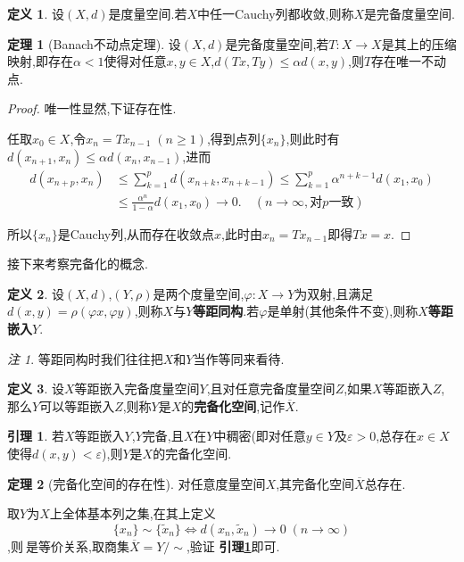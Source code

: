 \documentclass{ctexart}
\theoremstyle{definition}
\newtheorem{definition}{定义}
\newtheorem{lemma}{引理}
\newtheorem{theorem}{定理}
\theoremstyle{remark}
\newtheorem*{remark}{注}
\newenvironment{proofsketch}{
  \renewcommand{\proofname}{证明概要}\proof}{\endproof}
\newcommand\lemmaref[1]{\textbf{引理\ref{#1}}}
\begin{document}
	\begin{definition}
		设$(X,d)$是度量空间.若$X$中任一Cauchy列都收敛,则称$X$是完备度量空间.
	\end{definition}
	\begin{theorem}[Banach不动点定理]
		设$(X,d)$是完备度量空间,若$T:X\to X$是其上的压缩映射,即存在$\alpha<1$使得对任意$x,y\in X$,$d(Tx,Ty)\le\alpha d(x,y)$,则$T$存在唯一不动点.
	\end{theorem}
	\begin{proof}
		唯一性显然,下证存在性.
		
		任取$x_0\in X$,令$x_n=Tx_{n-1}\;(n\ge 1)$,得到点列$\{x_n\}$,则此时有$d(x_{n+1},x_n)\le\alpha d(x_n,x_{n-1})$,进而
		\begin{align*}
			d(x_{n+p},x_n) & \le\sum_{k=1}^p{d(x_{n+k},x_{n+k-1})}\le\sum_{k=1}^p{\alpha^{n+k-1}d(x_1,x_0)} \\
			& \le\frac{\alpha^n}{1-\alpha}d(x_1,x_0)\to 0.\quad(n\to\infty,\mbox{对}p\mbox{一致})
		\end{align*}
		
		所以$\{x_n\}$是Cauchy列,从而存在收敛点$x$,此时由$x_n=Tx_{n-1}$即得$Tx=x$.
	\end{proof}
	
	接下来考察完备化的概念.
	\begin{definition}
		设$(X,d)$,$(Y,\rho)$是两个度量空间,$\varphi:X\to Y$为双射,且满足$d(x,y)=\rho(\varphi x,\varphi y)$,则称$X$与$Y$\textbf{等距同构}.若$\varphi$是单射(其他条件不变),则称$X$\textbf{等距嵌入}$Y$.
	\end{definition}
	\begin{remark}
		等距同构时我们往往把$X$和$Y$当作等同来看待.
	\end{remark}
	\begin{definition}
		设$X$等距嵌入完备度量空间$Y$,且对任意完备度量空间$Z$,如果$X$等距嵌入$Z$,那么$Y$可以等距嵌入$Z$,则称$Y$是$X$的\textbf{完备化空间},记作$\overline{X}$.
	\end{definition}
	\begin{lemma}\label{complete-lemma}
		若$X$等距嵌入$Y$,$Y$完备,且$X$在$Y$中稠密(即对任意$y\in Y$及$\varepsilon>0$,总存在$x\in X$使得$d(x,y)<\varepsilon$),则$Y$是$X$的完备化空间.
	\end{lemma}
	\begin{theorem}[完备化空间的存在性]
		对任意度量空间$X$,其完备化空间$\overline{X}$总存在.
	\end{theorem}
	\begin{proofsketch}
		取$Y$为$X$上全体基本列之集,在其上定义
		$$\{x_n\}\sim\{\tilde{x}_n\}\Leftrightarrow d(x_n,\tilde{x}_n)\to 0\;(n\to\infty)$$
		,则$~$是等价关系,取商集$\overline{X}=Y/\sim$,验证 \lemmaref{complete-lemma}即可.
	\end{proofsketch}
	
\end{document}
